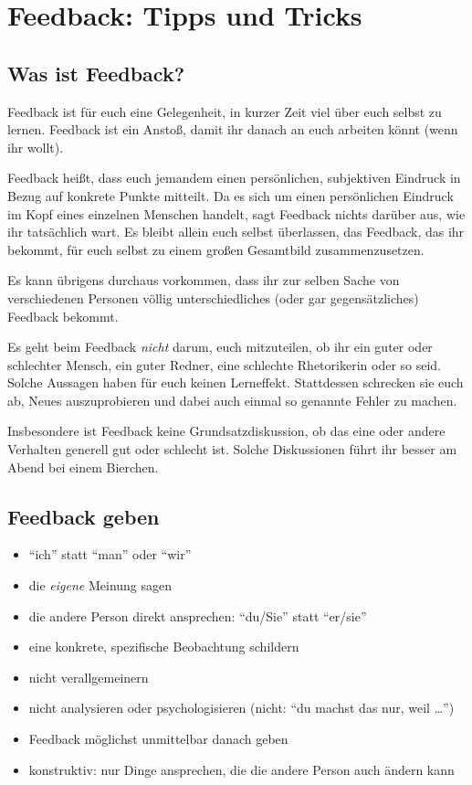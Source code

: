 \section{Feedback: Tipps und Tricks}
\label{feedback-regeln}

\subsection{Was ist Feedback?}
Feedback ist für euch eine Gelegenheit, in kurzer Zeit viel über euch selbst zu lernen. Feedback ist ein Anstoß, damit ihr danach an euch arbeiten könnt (wenn ihr wollt).

Feedback heißt, dass euch jemandem einen persönlichen, subjektiven Eindruck in Bezug auf konkrete Punkte mitteilt. Da es sich um einen persönlichen Eindruck im Kopf eines einzelnen Menschen handelt, sagt Feedback nichts darüber aus, wie ihr tatsächlich wart. Es bleibt allein euch selbst überlassen, das Feedback, das ihr bekommt, für euch selbst zu einem großen Gesamtbild zusammenzusetzen.

Es kann übrigens durchaus vorkommen, dass ihr zur selben Sache von verschiedenen Personen völlig unterschiedliches (oder gar gegensätzliches) Feedback bekommt.

Es geht beim Feedback \emph{nicht} darum, euch mitzuteilen, ob ihr ein guter oder schlechter Mensch, ein guter Redner, eine schlechte Rhetorikerin oder so seid. Solche Aussagen haben für euch keinen Lerneffekt. Stattdessen schrecken sie euch ab, Neues auszuprobieren und dabei auch einmal so genannte Fehler zu machen.

Insbesondere ist Feedback keine Grundsatzdiskussion, ob das eine oder andere Verhalten generell gut oder schlecht ist. Solche Diskussionen führt ihr besser am Abend bei einem Bierchen.

\subsection{Feedback geben}
\begin{itemize}
  \item  "`ich"' statt "`man"' oder "`wir"'
  \item die \emph{eigene} Meinung sagen
  \item die andere Person direkt ansprechen: "`du/Sie"' statt "`er/sie"'
  \item eine konkrete, spezifische Beobachtung schildern
  \item nicht verallgemeinern
  \item nicht analysieren oder psychologisieren (nicht: "`du machst das nur, weil \ldots"')
  \item Feedback möglichst unmittelbar danach geben
  \item konstruktiv: nur Dinge ansprechen, die die andere Person auch ändern kann
\end{itemize}

